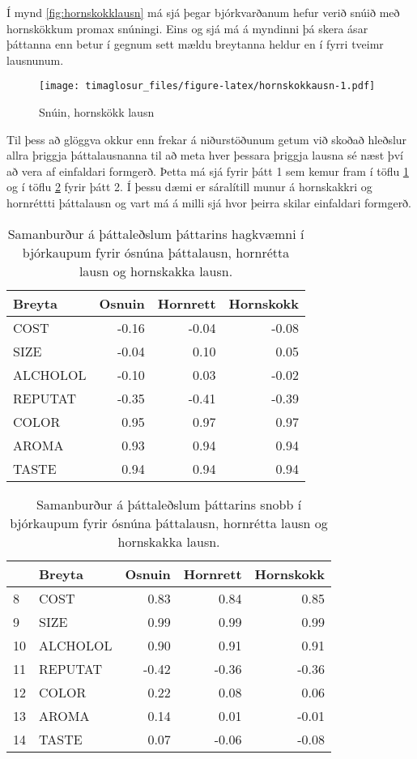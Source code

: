 \documentclass[]{book}
\begin{document}
Í mynd \ref{fig:hornskokklausn} má sjá þegar bjórkvarðanum hefur verið snúið með hornskökkum promax snúningi. Eins og sjá má á myndinni þá skera ásar þáttanna enn betur í gegnum sett mældu breytanna heldur en í fyrri tveimr lausnunum.

\begin{figure}
\centering
\texttt{[image: timaglosur\_files/figure-latex/hornskokkausn-1.pdf]}
\caption{\label{fig:hornskokkausn}Snúin, hornskökk lausn}
\end{figure}

Til þess að glöggva okkur enn frekar á niðurstöðunum getum við skoðað hleðslur allra þriggja þáttalausnanna til að meta hver þessara þriggja lausna sé næst því að vera af einfaldari formgerð. Þetta má sjá fyrir þátt 1 sem kemur fram í töflu \ref{tab:samanbthatt1} og í töflu \ref{tab:samanbthatt2} fyrir þátt 2. Í þessu dæmi er sáralítill munur á hornskakkri og hornréttti þáttalausn og vart má á milli sjá hvor þeirra skilar einfaldari formgerð.

\begin{table}

\caption{\label{tab:samanbthatt1}Samanburður á þáttaleðslum þáttarins hagkvæmni í bjórkaupum fyrir ósnúna þáttalausn, hornrétta lausn og hornskakka lausn. }
\centering
\begin{tabular}[t]{l|r|r|r}
\hline
Breyta & Osnuin & Hornrett & Hornskokk\\
\hline
COST & -0.16 & -0.04 & -0.08\\
\hline
SIZE & -0.04 & 0.10 & 0.05\\
\hline
ALCHOLOL & -0.10 & 0.03 & -0.02\\
\hline
REPUTAT & -0.35 & -0.41 & -0.39\\
\hline
COLOR & 0.95 & 0.97 & 0.97\\
\hline
AROMA & 0.93 & 0.94 & 0.94\\
\hline
TASTE & 0.94 & 0.94 & 0.94\\
\hline
\end{tabular}
\end{table}

\begin{table}

\caption{\label{tab:samanbthatt2}Samanburður á þáttaleðslum þáttarins snobb í bjórkaupum fyrir ósnúna þáttalausn, hornrétta lausn og hornskakka lausn. }
\centering
\begin{tabular}[t]{l|l|r|r|r}
\hline
  & Breyta & Osnuin & Hornrett & Hornskokk\\
\hline
8 & COST & 0.83 & 0.84 & 0.85\\
\hline
9 & SIZE & 0.99 & 0.99 & 0.99\\
\hline
10 & ALCHOLOL & 0.90 & 0.91 & 0.91\\
\hline
11 & REPUTAT & -0.42 & -0.36 & -0.36\\
\hline
12 & COLOR & 0.22 & 0.08 & 0.06\\
\hline
13 & AROMA & 0.14 & 0.01 & -0.01\\
\hline
14 & TASTE & 0.07 & -0.06 & -0.08\\
\hline
\end{tabular}
\end{table}
\end{document}
